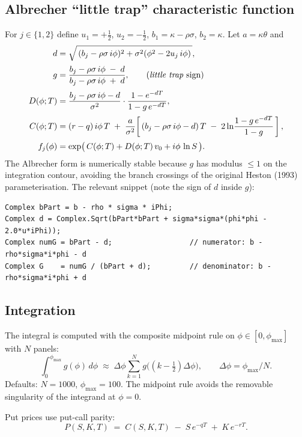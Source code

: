 \documentclass[11pt,a4paper]{article}
\begin{document}
\subsection{Albrecher ``little trap'' characteristic function}
For $j \in \{1,2\}$ define $u_1 = +\tfrac12$, $u_2 = -\tfrac12$,
$b_1 = \kappa - \rho\sigma$, $b_2 = \kappa$. Let $a = \kappa\theta$ and
\begin{align*}
d &= \sqrt{\,(b_j - \rho\sigma\, i\phi)^2 + \sigma^2 (\phi^2 - 2 u_j\, i \phi)\,},\\[2pt]
g &= \frac{b_j - \rho\sigma\, i\phi \;-\; d}{b_j - \rho\sigma\, i\phi \;+\; d},
\qquad\text{(\emph{little trap} sign)}\\[2pt]
D(\phi; T) &= \frac{b_j - \rho\sigma\, i\phi - d}{\sigma^2}\cdot
\frac{1 - e^{-d T}}{1 - g\, e^{-d T}},\\[2pt]
C(\phi; T) &= (r-q)\, i\phi\, T \;+\; \frac{a}{\sigma^2}\!\left[\,
(b_j - \rho\sigma\, i\phi - d)\, T \;-\; 2 \ln\!\frac{1 - g\, e^{-d T}}{1 - g}\,\right],\\[2pt]
f_j(\phi) &= \exp\!\big(\,C(\phi;T) + D(\phi;T)\, v_0 + i\phi\, \ln S\,\big).
\end{align*}
The Albrecher form is numerically stable because $g$ has modulus $\le 1$ on the
integration contour, avoiding the branch crossings of the original Heston (1993)
parameterisation. The relevant snippet (note the sign of $d$ inside $g$):

\begin{lstlisting}
Complex bPart = b - rho * sigma * iPhi;
Complex d = Complex.Sqrt(bPart*bPart + sigma*sigma*(phi*phi - 2.0*u*iPhi));
Complex numG = bPart - d;                  // numerator: b - rho*sigma*i*phi - d
Complex G    = numG / (bPart + d);         // denominator: b - rho*sigma*i*phi + d
\end{lstlisting}

\subsection{Integration}
The integral is computed with the composite midpoint rule on
$\phi \in [0, \phi_{\max}]$ with $N$ panels:
\[
\int_0^{\phi_{\max}} g(\phi)\, d\phi \;\approx\; \Delta\phi \sum_{k=1}^{N} g\!\big((k - \tfrac12)\Delta\phi\big),
\qquad \Delta\phi = \phi_{\max}/N.
\]
Defaults: $N = 1000$, $\phi_{\max} = 100$. The midpoint rule avoids the removable
singularity of the integrand at $\phi=0$.

Put prices use put-call parity:
\[
P(S,K,T) \;=\; C(S,K,T) \;-\; S\, e^{-q T} \;+\; K\, e^{-r T}.
\]
\end{document}
